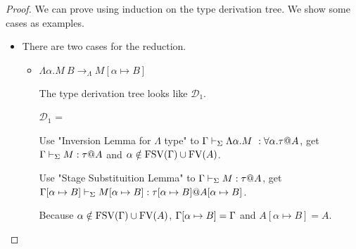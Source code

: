 \begin{proof}
	We can prove using induction on the type derivation tree.
	We show some cases as examples.
	\begin{itemize}
		\newcommand{\R}{\longrightarrow_{\Lambda}}
		\item \TIns
		      		      	      	      	      	      	      	      	      	      		      	      	      	      
		      There are two cases for the reduction.
		      \begin{itemize}
		      	\item $\Lambda\alpha.M\ B \R M[\alpha \mapsto B]$
		      	      		      	      	      	      	      	      	      	      	      	      	      	      	      	      	      	      	      	      		      	      	      	      	      	      	      	      
		      	      The type derivation tree looks like $\mathcal{D}_1$.
		      	      		      	      	      	      	      	      	      	      	      	      	      	      	      	      	      	      	      	      		      	      	      	      	      	      	      	      
		      	      $\mathcal{D}_1$ = 
		      	      {}
		      	      		      	      	      	      	      	      	      	      	      	      	      	      	      	      	      	      	      	      		      	      	      	      	      	      	      	      
		      	      Use "Inversion Lemma for $\Lambda$ type" to $\Gamma \vdash_\Sigma \Lambda\alpha.M\ : \forall\alpha.\tau @ A$,
		      	      get $\Gamma \vdash_\Sigma M : \tau @ A$ and $\alpha \notin \text{FSV}(\Gamma) \cup \text{FV}(A)$.
		      	      		      	      	      	      	      	      	      	      	      	      	      	      	      	      	      	      	      	      		      	      	      	      	      	      	      	      
		      	      Use "Stage Substituition Lemma" to $\Gamma \vdash_\Sigma M : \tau @ A$,
		      	      get $\Gamma[\alpha \mapsto B] \vdash_\Sigma M[\alpha \mapsto B] : \tau[\alpha \mapsto B] @ A[\alpha \mapsto B]$.
		      	      		      	      	      	      	      	      	      	      	      	      	      	      	      	      	      	      	      	      		      	      	      	      	      	      	      	      
		      	      Because $\alpha \notin \text{FSV}(\Gamma) \cup \text{FV}(A)$, $\Gamma[\alpha \mapsto B] = \Gamma$ and $A[\alpha \mapsto B] = A$.
		      	      		      	      	      	      	      	      	      	      	      	      	      	      	      	      	      	      	      	      		      	      	      	      	      	      	      	      

\end{itemize}
\end{itemize}
\end{proof}
